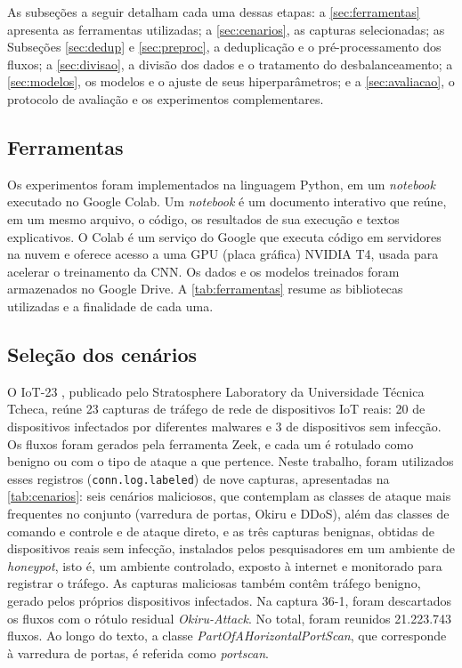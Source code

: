 \documentclass[alpha-refs,brazilian]{CC-EC_TF-TC}
\begin{document}
As subseções a seguir detalham cada uma dessas etapas: a \autoref{sec:ferramentas} apresenta as ferramentas utilizadas; a \autoref{sec:cenarios}, as capturas selecionadas; as Subseções \ref{sec:dedup} e \ref{sec:preproc}, a deduplicação e o pré-processamento dos fluxos; a \autoref{sec:divisao}, a divisão dos dados e o tratamento do desbalanceamento; a \autoref{sec:modelos}, os modelos e o ajuste de seus hiperparâmetros; e a \autoref{sec:avaliacao}, o protocolo de avaliação e os experimentos complementares.

\subsection{Ferramentas}
\label{sec:ferramentas}

Os experimentos foram implementados na linguagem Python, em um \textit{notebook} executado no Google Colab. Um \textit{notebook} é um documento interativo que reúne, em um mesmo arquivo, o código, os resultados de sua execução e textos explicativos. O Colab é um serviço do Google que executa código em servidores na nuvem e oferece acesso a uma GPU (placa gráfica) NVIDIA T4, usada para acelerar o treinamento da CNN. Os dados e os modelos treinados foram armazenados no Google Drive. A \autoref{tab:ferramentas} resume as bibliotecas utilizadas e a finalidade de cada uma.

\subsection{Seleção dos cenários}
\label{sec:cenarios}

O IoT-23 \citep{garcia2020iot23}, publicado pelo Stratosphere Laboratory da Universidade Técnica Tcheca, reúne 23 capturas de tráfego de rede de dispositivos IoT reais: 20 de dispositivos infectados por diferentes malwares e 3 de dispositivos sem infecção. Os fluxos foram gerados pela ferramenta Zeek, e cada um é rotulado como benigno ou com o tipo de ataque a que pertence. Neste trabalho, foram utilizados esses registros (\texttt{conn.log.labeled}) de nove capturas, apresentadas na \autoref{tab:cenarios}: seis cenários maliciosos, que contemplam as classes de ataque mais frequentes no conjunto (varredura de portas, Okiru e DDoS), além das classes de comando e controle e de ataque direto, e as três capturas benignas, obtidas de dispositivos reais sem infecção, instalados pelos pesquisadores em um ambiente de \textit{honeypot}, isto é, um ambiente controlado, exposto à internet e monitorado para registrar o tráfego. As capturas maliciosas também contêm tráfego benigno, gerado pelos próprios dispositivos infectados. Na captura 36-1, foram descartados os fluxos com o rótulo residual \textit{Okiru-Attack}. No total, foram reunidos 21.223.743 fluxos. Ao longo do texto, a classe \textit{PartOfAHorizontalPortScan}, que corresponde à varredura de portas, é referida como \textit{portscan}.
\end{document}
